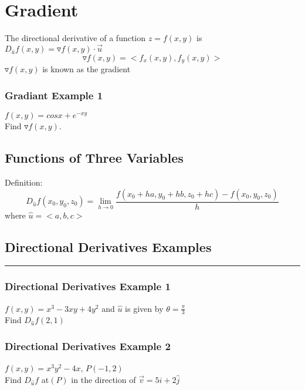 \documentclass[12pt]{article}
\begin{document}
\section{Gradient}
The directional derivative of a function \(z=f(x,y)\) is \(D_{\hat{u}}f(x,y) = \triangledown f(x,y) \cdot \vec{u} \)
\[
	\triangledown f(x,y) = <f_x(x,y),f_y(x,y)>
\]
\(\triangledown f(x,y)\) is known as the gradient 

\subsubsection{Gradiant Example 1}
\(f(x,y) = cosx + e^{-xy}\)\\ 
Find \(\triangledown f(x,y)\).

\subsection{Functions of Three Variables}
Definition:
\[
	D_{\hat{u}}f(x_0,y_0,z_0) = \lim_{h \to 0} \frac{f(x_0+ha,y_0+hb,z_0+hc) - f(x_0,y_0,z_0)}{h}
\]
where \(\hat{u} = <a,b,c>\)

\subsection{Directional Derivatives Examples}
\rule{\textwidth}{0.1mm}

\subsubsection{Directional Derivatives Example 1}
\(f(x,y) = x^3 - 3xy + 4y^2\) and \(\hat{u}\) is given by \(\theta = \frac{\pi}{3}\)\\
Find \(D_{\hat{u}}f(2,1)\)

\subsubsection{Directional Derivatives Example 2}
\(f(x,y) = x^3y^2 - 4x\), \(P(-1,2)\)\\
Find \(D_{\hat{u}}f\) at\((P)\) in the direction of \(\vec{v} = 5\hat{i} + 2\hat{j}\)
\end{document}
